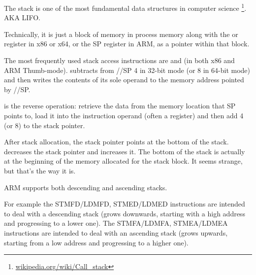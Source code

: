 \mysection{\Stack}
\label{sec:stack}
\myindex{\Stack}

The stack is one of the most fundamental data structures in computer science
\footnote{\href{http://en.wikipedia.org/wiki/Call_stack}{wikipedia.org/wiki/Call\_stack}}.
\ac{AKA} \ac{LIFO}.

Technically, it is just a block of memory in process memory along with the \ESP or \RSP register in x86 or x64, or the \ac{SP} register in ARM, as a pointer within that block.

The most frequently used stack access instructions are \PUSH and \POP (in both x86 and ARM Thumb-mode). 
\PUSH subtracts from \ESP/\RSP/\ac{SP} 4 in 32-bit mode (or 8 in 64-bit mode) and then writes the contents of its sole operand to the memory address pointed by \ESP/\RSP/\ac{SP}.

\POP is the reverse operation: retrieve the data from the memory location that \ac{SP} points to, 
load it into the instruction operand (often a register) and then add 4 (or 8) to the \gls{stack pointer}.

After stack allocation, the \gls{stack pointer} points at the bottom of the stack.
\PUSH decreases the \gls{stack pointer} and \POP increases it.
The bottom of the stack is actually at the beginning of the memory allocated for the stack block. It seems strange, but that's the way it is.

ARM supports both descending and ascending stacks.


For example the \ac{STMFD}/\ac{LDMFD}, \ac{STMED}/\ac{LDMED} instructions are intended to deal with a descending stack (grows downwards, starting with a high address and progressing to a lower one).
The \ac{STMFA}/\ac{LDMFA}, \ac{STMEA}/\ac{LDMEA} instructions are intended to deal with an ascending stack (grows upwards, starting from a low address and progressing to a higher one).


